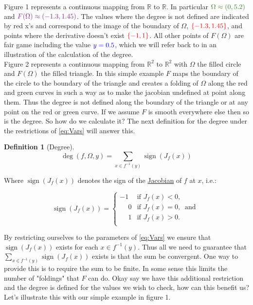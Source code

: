 \documentclass[11pt]{article}
\theoremstyle{plain}
\theoremstyle{definition}
\newtheorem{cdef}{Definition}[section]
\theoremstyle{remark}
\newcommand{\p}{\phantom{-}}
\begin{document}
Figure 1 represents a continuous mapping from $\mathbb{R}$ to $\mathbb{R}$. In particular ${\color{OliveGreen}\Omega\approx(0,5.2)}$ and ${\color{Fuchsia}F(\Omega)\approx(-1.3,1.45)}$. The values where the degree is not defined are indicated by red x's and correspond to the image of the boundary of $\Omega$, ${\color{red}\{-1.3,1.45\}}$, and points where the derivative doesn't exist ${\color{red}\{-1,1\}}$. All other points of $F(\Omega)$ are fair game including the value ${\color{blue}y=0.5}$, which we will refer back to in an illustration of the calculation of the degree.\\
Figure 2 represents a continuous mapping from $\mathbb{R}^2$ to $\mathbb{R}^2$ with $\Omega$ the filled circle and $F(\Omega)$ the filled triangle. In this simple example $F$ maps the boundary of the circle to the boundary of the triangle and creates a folding of $\Omega$ along the red and green curves in such a way as to make the jacobian undefined at point along them. Thus the degree is not defined along the boundary of the triangle or at any point on the red or green curve. If we assume $F$ is smooth everywhere else then so is the degree. So how do we calculate it? The next definition for the degree under the restrictions of \eqref{eq:Vars} will answer this. 


\begin{cdef}[Degree]\label{ddef} \ \\
$$\operatorname{deg}\left(f,\Omega,y\right)=\sum\limits_{x\in f^{-1}(y)}\operatorname{sign}\left(J_f(x)\right)$$
\end{cdef}

Where $\operatorname{sign}\left(J_f(x)\right)$ denotes the sign of the \href{https://en.wikipedia.org/wiki/Jacobian_matrix_and_determinant}{Jacobian} of $f$ at $x$, i.e.:

\[\operatorname{sign}\left(J_f(x)\right)=   \left\{
\begin{array}{ll}
      -1   & \mbox{if } J_f(x)< 0, \\
      \p 0 & \mbox{if } J_f(x)= 0,~\mbox{ and } \\
      \p 1 & \mbox{if } J_f(x)> 0. \\
\end{array} 
\right. \]

By restricting ourselves to the parameters of \eqref{eq:Vars} we ensure that $\operatorname{sign}\left(J_f(x)\right)$ exists for each $x\in f^{-1}(y)$.
Thus all we need to guarantee that $\sum\limits_{x\in f^{-1}(y)}\operatorname{sign}\left(J_f(x)\right)$ exists is that the sum be convergent. One way to provide this is to require the sum to be finite. In some sense this limits the number of "foldings" that $F$ can do. Okay say we have this additional restriction and the degree is defined for the values we wish to check, how can this benefit us? Let's illustrate this with our simple example in figure 1.
\end{document}
